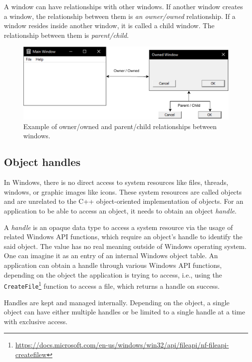 A window can have relationships with other windows. If another window creates a window, the relationship between them is \textit{an owner/owned} relationship. If a window resides inside another window, it is called a child window. The relationship between them is \textit{parent/child}.\cite{WinWindow}
\begin{figure}[htbp]
	\centering
	\includegraphics[width=\columnwidth]{obrazky-figures/windows_rels.pdf}
	\caption{Example of owner/owned and parent/child relationships between windows.}
	\label{windowsExample}
\end{figure}

\subsection*{Object handles}
\label{ch2handle}
In Windows, there is no direct access to system resources like files, threads, windows, or graphic images like icons. These system resources are called objects and are unrelated to the C++ object-oriented implementation of objects. For an application to be able to access an object, it needs to obtain an object \textit{handle}.

A \textit{handle} is an opaque data type to access a system resource via the usage of related Windows API functions, which require an object's handle to identify the said object. The value has no real meaning outside of Windows operating system. One can imagine it as an entry of an internal Windows object table. An application can obtain a handle through various Windows API functions, depending on the object the application is trying to access, i.e., using the \lstinline{CreateFile}\footnote{\url{https://docs.microsoft.com/en-us/windows/win32/api/fileapi/nf-fileapi-createfilew}} function to access a file, which returns a handle on success.\cite{HandlesAndObjects}

Handles are kept and managed internally. Depending on the object, a single object can have either multiple handles or be limited to a single handle at a time with exclusive access.\cite{WinHandleLimits}

